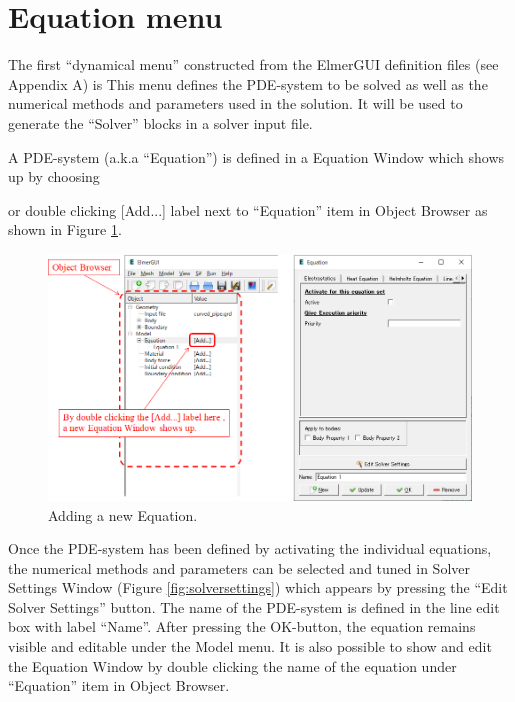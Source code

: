 \section{Equation menu}

The first ``dynamical menu'' constructed from the ElmerGUI definition files (see Appendix A) is
\noindent This menu defines the PDE-system to be solved as well as the numerical
methods and parameters used in the solution. It will be used to generate the ``Solver''
blocks in a solver input file.

A PDE-system (a.k.a ``Equation'') is defined in a Equation Window which shows up by choosing

\noindent or double clicking [Add...] label next to ``Equation'' item in Object Browser as shown in Figure \ref{fig:equation}.

\begin{figure}[htb]
\begin{center}
 \includegraphics[scale=0.5]{images/equation.png}
\caption{Adding a new Equation.}
\label{fig:equation}
\end{center}
\end{figure}

Once the PDE-system has been defined by activating the individual equations, the numerical
methods and parameters can be selected and tuned in Solver Settings Window (Figure \ref{fig:solversettings}) which appears by pressing the ``Edit Solver Settings'' button.
The name of the PDE-system is defined in the line edit box with label ``Name''. After pressing
the OK-button, the equation remains visible and editable under the Model menu. 
It is also possible to show and edit the Equation Window by double clicking the name of the equation under ``Equation'' item in Object Browser.

